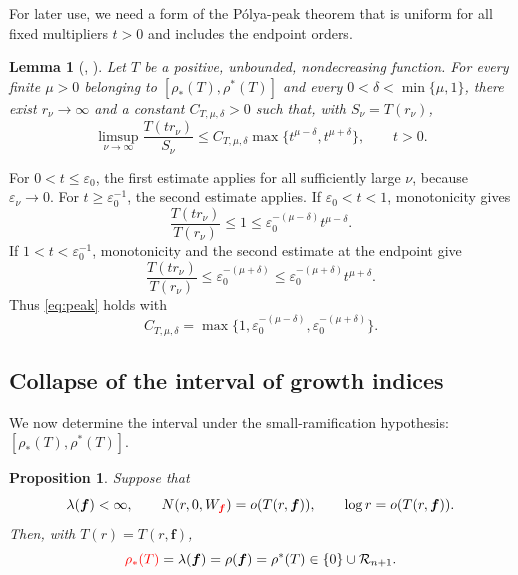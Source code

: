 \documentclass[12pt,letterpaper,reqno]{amsart}
\newtheorem{lem}[thm]{Lemma}
\newtheorem{prop}[thm]{Proposition}
\theoremstyle{definition}
\numberwithin{equation}{section}
\newcommand{\Gn}{\mathcal R_{n+1}}
\newcommand{\fv}{\bm f}
\newcommand{\revision}[1]{\textcolor{red}{#1}}
\begin{document}
For later use, we need a form of the P\'olya-peak theorem that is
uniform for all fixed multipliers \(t>0\) and includes the endpoint
orders. 

\begin{lem}[\cite{DS72}, \cite{Ere93}]
\label{lem:peaks}
Let \(T\) be a positive, unbounded, nondecreasing function. For every
finite \(\mu>0\) belonging to
\([\rho_*(T),\rho^*(T)]\) and every
\(0<\delta<\min\{\mu,1\}\), there exist
\(r_\nu\to\infty\) and a constant \(C_{T,\mu,\delta}>0\) such that,
with \(S_\nu=T(r_\nu)\),
\begin{equation}\label{eq:peak}
 \limsup_{\nu\to\infty}
 \frac{T(tr_\nu)}{S_\nu}
 \leq
 C_{T,\mu,\delta}
 \max\{t^{\mu-\delta},t^{\mu+\delta}\},
 \qquad t>0.
\end{equation}
\end{lem}

For \(0<t\leq\varepsilon_0\), the first estimate applies for all
sufficiently large \(\nu\), because \(\varepsilon_\nu\to0\). For
\(t\geq\varepsilon_0^{-1}\), the second estimate applies. If
\(\varepsilon_0<t<1\), monotonicity gives
\[
 \frac{T(tr_\nu)}{T(r_\nu)}\leq1
 \leq
 \varepsilon_0^{-(\mu-\delta)}t^{\mu-\delta}.
\]
If \(1<t<\varepsilon_0^{-1}\), monotonicity and the second estimate at
the endpoint give
\[
 \frac{T(tr_\nu)}{T(r_\nu)}
 \leq
 \varepsilon_0^{-(\mu+\delta)}
 \leq
 \varepsilon_0^{-(\mu+\delta)}t^{\mu+\delta}.
\]
Thus \eqref{eq:peak} holds with
\[
 C_{T,\mu,\delta}
 =
 \max\{1,\varepsilon_0^{-(\mu-\delta)},
           \varepsilon_0^{-(\mu+\delta)}\}.
\]


\subsection{Collapse of the interval of growth indices}
\label{sec:index-collapse}

We now determine the interval under the small-ramification hypothesis:
$
[\rho_*(T),\rho^*(T)].
$

\begin{prop}\label{prop:indices}
Suppose that
\[
\lambda(\fv)<\infty,
\qquad
N(r,0,W_{\revision{\fv}})=o(T(r,\fv)),
\qquad
\log r=o(T(r,\fv)).
\]
Then, with \(T(r)=T(r,\fv)\),
\begin{equation}\label{eq:indices-collapse}
 \revision{\rho_*(T)}
 =
 \lambda(\fv)
 =
 \rho(\fv)
 =
 \rho^*(T)
 \in
 \{0\}\cup\Gn.
\end{equation}
\end{prop}
\end{document}
